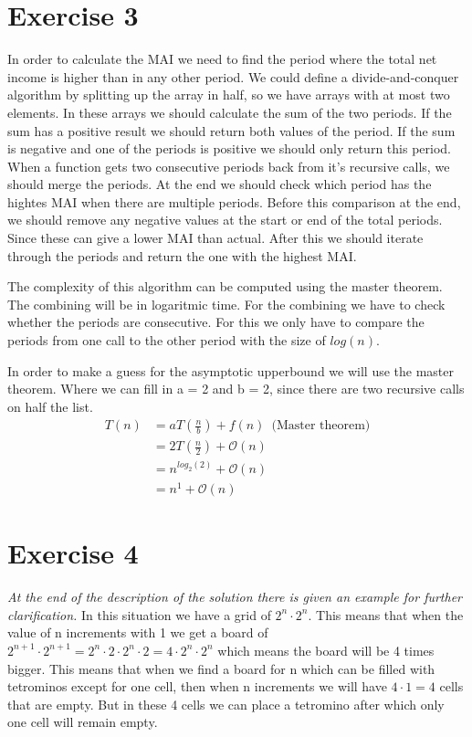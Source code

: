\documentclass{article}
\newcommand{\bigO}{\mathcal{O}}
\begin{document}
\newpage
\section*{Exercise 3}
In order to calculate the MAI we need to find the period where the total net income is higher than in any other period. We could define a divide-and-conquer algorithm by splitting up the array in half, so we have arrays with at most two elements. In these arrays we should calculate the sum of the two periods. If the sum has a positive result we should return both values of the period. If the sum is negative and one of the periods is positive we should only return this period. When a function gets two consecutive periods back from it's recursive calls, we should merge the periods. At the end we should check which period has the hightes MAI when there are multiple periods. Before this comparison at the end, we should remove any negative values at the start or end of the total periods. Since these can give a lower MAI than actual. After this we should iterate through the periods and return the one with the highest MAI.

The complexity of this algorithm can be computed using the master theorem. The combining will be in logaritmic time. For the combining we have to check whether the periods are consecutive. For this we only have to compare the periods from one call to the other period with the size of $log(n)$.

In order to make a guess for the asymptotic upperbound we will use the master theorem. Where we can fill in a = 2 and b = 2, since there are two recursive calls on half the list.
\begin{align*}
  T(n) &= aT(\frac{n}{b}) + f(n) \enspace \text{(Master theorem)}\\
   &= 2T(\frac{n}{2}) + \bigO (n) \\
   &= n^{log_2(2)} + \bigO (n) \\
   &= n^{1} + \bigO (n)
\end{align*}

\newpage
\section*{Exercise 4}
\emph{At the end of the description of the solution there is given an example for further clarification.}
\newline
In this situation we have a grid of $2^n \cdot 2^n$. This means that when the value of n increments with 1 we get a board of $2^{n+1} \cdot 2^{n+1}= 2^n \cdot 2 \cdot 2^n \cdot 2 = 4 \cdot 2^n \cdot 2^n$ which means the board will be 4 times bigger. This means that when we find a board for n which can be filled with tetrominos except for one cell, then when n increments we will have $4 \cdot 1 = 4$ cells that are empty. But in these 4 cells we can place a tetromino after which only one cell will remain empty.
\end{document}
